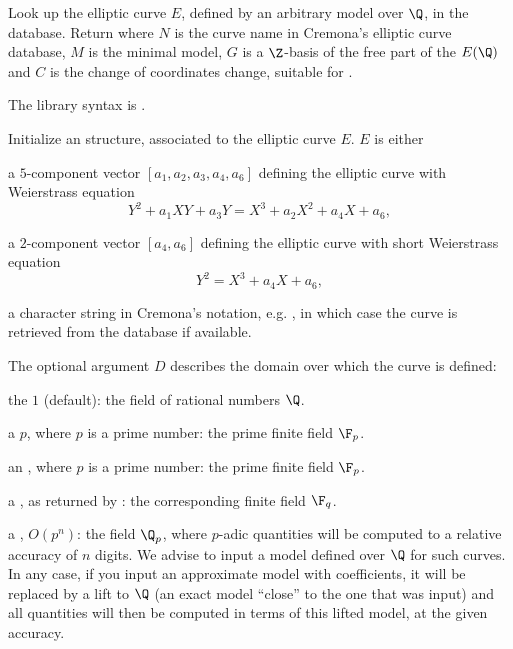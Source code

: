 \label{se:ellidentify}
Look up the elliptic curve $E$, defined by an arbitrary model over $\Q$,
in the  database.
Return \kbd{[[N, M, G], C]}  where $N$ is the curve name in Cremona's
elliptic curve database, $M$ is the minimal model, $G$ is a $\Z$-basis of
the free part of the  $E(\Q)$ and $C$ is the
change of coordinates change, suitable for .

The library syntax is .

\label{se:ellinit}
Initialize an  structure, associated to the elliptic curve $E$.
$E$ is either

\item a $5$-component vector $[a_1,a_2,a_3,a_4,a_6]$ defining the elliptic
curve with Weierstrass equation
$$ Y^2 + a_1 XY + a_3 Y = X^3 + a_2 X^2 + a_4 X + a_6, $$

\item a $2$-component vector $[a_4,a_6]$ defining the elliptic
curve with short Weierstrass equation
$$ Y^2 = X^3 + a_4 X + a_6, $$

\item a character string in Cremona's notation, e.g. , in which
case the curve is retrieved from the  database if available.

The optional argument $D$ describes the domain over which the curve is
defined:

\item the  $1$ (default): the field of rational numbers $\Q$.

\item a  $p$, where $p$ is a prime number: the prime finite field
$\F_p$.

\item an  , where $p$ is a prime number: the
prime finite field $\F_p$.

\item a , as returned by : the corresponding finite
field $\F_q$.

\item a , $O(p^n)$: the field $\Q_p$, where $p$-adic quantities
will be computed to a relative accuracy of $n$ digits. We advise to input a
model defined over $\Q$ for such curves. In any case, if you input an
approximate model with  coefficients, it will be replaced by a lift
to $\Q$ (an exact model ``close'' to the one that was input) and all quantities
will then be computed in terms of this lifted model, at the given accuracy.

